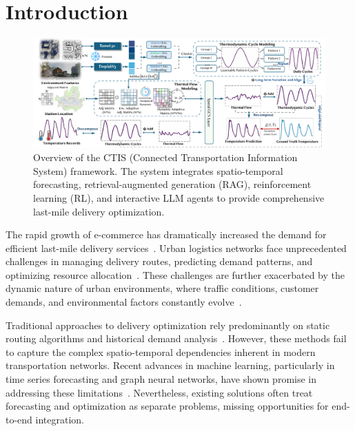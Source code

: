 \section{Introduction}
\label{sec:intro}

\begin{figure}[t!]
    \centering
    \includegraphics[width=1.0\linewidth]{resources/framework.pdf}
    \vspace{-1em}
    \caption{Overview of the CTIS (Connected Transportation Information System) framework. The system integrates spatio-temporal forecasting, retrieval-augmented generation (RAG), reinforcement learning (RL), and interactive LLM agents to provide comprehensive last-mile delivery optimization.}
    \label{fig:framework}
    \vspace{-1.5em}
\end{figure}

The rapid growth of e-commerce has dramatically increased the demand for efficient last-mile delivery services~\cite{savelsbergh2016vehicle,wang2021review}. Urban logistics networks face unprecedented challenges in managing delivery routes, predicting demand patterns, and optimizing resource allocation~\cite{boysen2021last,winkenbach2016enabling}. These challenges are further exacerbated by the dynamic nature of urban environments, where traffic conditions, customer demands, and environmental factors constantly evolve~\cite{liu2020vehicle,ulmer2021strategic}.

Traditional approaches to delivery optimization rely predominantly on static routing algorithms and historical demand analysis~\cite{toth2014vehicle,vidal2013hybrid}. However, these methods fail to capture the complex spatio-temporal dependencies inherent in modern transportation networks. Recent advances in machine learning, particularly in time series forecasting and graph neural networks, have shown promise in addressing these limitations~\cite{bai2020adaptive,wu2019graph,li2018diffusion}. Nevertheless, existing solutions often treat forecasting and optimization as separate problems, missing opportunities for end-to-end integration.

